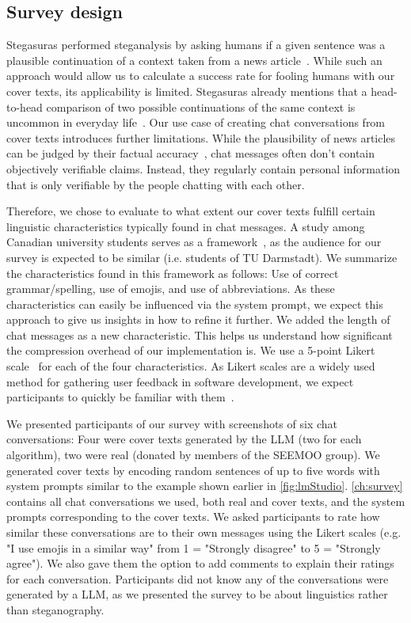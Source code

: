 \subsection{Survey design}
\label{sec:surveyDesign}
Stegasuras performed steganalysis by asking humans if a given sentence was a plausible continuation of a context taken from a news article~\cite{zieglerNeuralLinguisticSteganography2019}. While such an approach would allow us to calculate a success rate for fooling humans with our cover texts, its applicability is limited. Stegasuras already mentions that a head-to-head comparison of two possible continuations of the same context is uncommon in everyday life~\cite{zieglerNeuralLinguisticSteganography2019}. Our use case of creating chat conversations from cover texts introduces further limitations. While the plausibility of news articles can be judged by their factual accuracy~\cite{zieglerNeuralLinguisticSteganography2019}, chat messages often don't contain objectively verifiable claims. Instead, they regularly contain personal information that is only verifiable by the people chatting with each other.

Therefore, we chose to evaluate to what extent our cover texts fulfill certain linguistic characteristics typically found in chat messages. A study among Canadian university students serves as a framework~\cite{alazzawieLinguisticSituationalFeatures2022}, as the audience for our survey is expected to be similar (i.e. students of TU Darmstadt). We summarize the characteristics found in this framework as follows: Use of correct grammar/spelling, use of emojis, and use of abbreviations. As these characteristics can easily be influenced via the system prompt, we expect this approach to give us insights in how to refine it further. We added the length of chat messages as a new characteristic. This helps us understand how significant the compression overhead of our implementation is. We use a 5-point Likert scale~\cite{likertTechniqueMeasurementAttitudes1932} for each of the four characteristics. As Likert scales are a widely used method for gathering user feedback in software development, we expect participants to quickly be familiar with them~\cite{girayAssessmentStudentSatisfaction2021,tizardVoiceUsersExtended2022}.

We presented participants of our survey with screenshots of six chat conversations: Four were cover texts generated by the \gls{LLM} (two for each algorithm), two were real (donated by members of the SEEMOO group). We generated cover texts by encoding random sentences of up to five words with system prompts similar to the example shown earlier in \cref{fig:lmStudio}. \cref{ch:survey} contains all chat conversations we used, both real and cover texts, and the system prompts corresponding to the cover texts. We asked participants to rate how similar these conversations are to their own messages using the Likert scales (e.g. "I use emojis in a similar way" from 1 = "Strongly disagree" to 5 = "Strongly agree"). We also gave them the option to add comments to explain their ratings for each conversation. Participants did not know any of the conversations were generated by a \gls{LLM}, as we presented the survey to be about linguistics rather than steganography.


